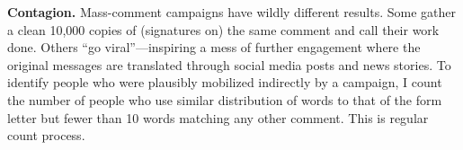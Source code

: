 \textbf{Contagion.} Mass-comment campaigns have wildly different results. Some gather a clean 10,000 copies of (signatures on) the same comment and call their work done. Others ``go viral''---inspiring a mess of further engagement where the original messages are translated through social media posts and news stories.
To identify people who were plausibly mobilized indirectly by a campaign, I count the number of people who use similar distribution of words to that of the form letter but fewer than 10 words matching any other comment. This is regular count process.


















